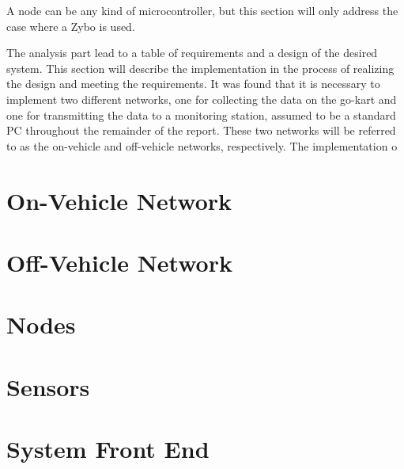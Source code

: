 A node can be any kind of microcontroller, but this section will only address the case where a Zybo is used. 

The analysis part lead to a table of requirements and a design of the desired system.
This section will describe the implementation  in the process of realizing the design and meeting the requirements.
It was found that it is necessary to implement two different networks, one for collecting the data on the go-kart and one for transmitting the data to a monitoring station, assumed to be a standard PC throughout the remainder of the report.
These two networks will be referred to as the on-vehicle and off-vehicle networks, respectively.
The implementation o
\section{On-Vehicle Network}






\section{Off-Vehicle Network}
\label{sec:wifi}

\section{Nodes}

\section{Sensors}

\section{System Front End}

